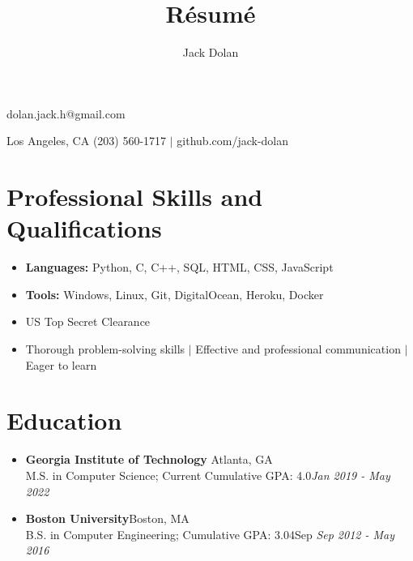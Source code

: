 \documentclass{article}
\makeatletter
\renewcommand{\maketitle}{ 
{\huge\bfseries\theauthor}\hfill dolan.jack.h@gmail.com 

\vspace{0.2em} 

Los Angeles, CA \hfill (203) 560-1717 $|$ github.com/jack-dolan
}
\makeatother
\begin{document}
 
\title{R\'esum\'e} 
\author{Jack Dolan} 
\maketitle
{}


\section{Professional Skills and Qualifications} \begin{itemize}
    \itemsep0em
    \item \textbf{Languages:} Python, C, C++, SQL, HTML, CSS, JavaScript
    \item \textbf{Tools:} Windows, Linux, Git, DigitalOcean, Heroku, Docker
    \item US Top Secret Clearance
    \item Thorough problem-solving skills $|$ Effective and professional communication $|$ Eager to learn \end{itemize} 


\section{Education} \begin{itemize}
    \itemsep0.2em
    \item \textbf{Georgia Institute of Technology} \hfill Atlanta, GA\\M.S. in Computer Science; Current Cumulative GPA: 4.0\hfill \emph{Jan 2019 - May 2022}
    \item \textbf{Boston University}\hfill Boston, MA\\B.S. in Computer Engineering; Cumulative GPA: 3.04\hfill Sep \emph{Sep 2012 - May 2016} \end{itemize} 
\end{document}
